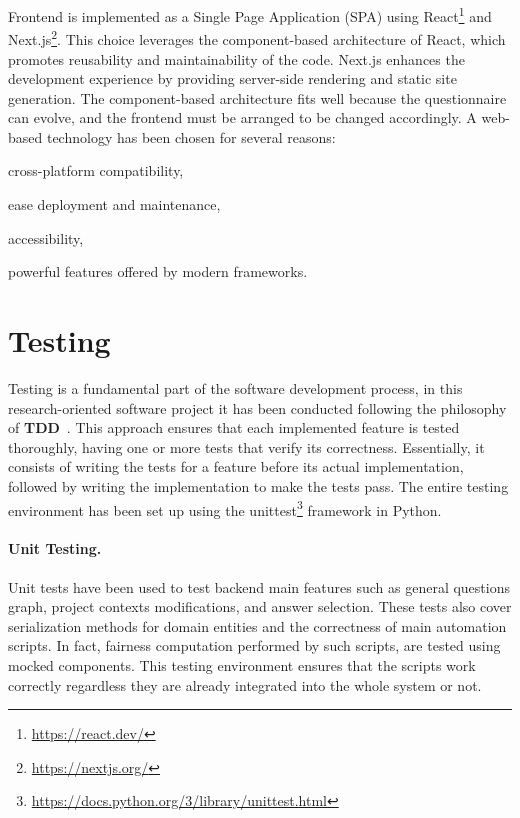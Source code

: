 \documentclass[12pt,a4paper,openright,twoside]{book}
\begin{document}
Frontend is implemented as a Single Page Application (SPA) using React\footnote{\url{https://react.dev/}} and Next.js\footnote{\url{https://nextjs.org/}}.
%
This choice leverages the component-based architecture of React, which promotes reusability and maintainability of the code.
%
Next.js enhances the development experience by providing server-side rendering and static site generation.
%
The component-based architecture fits well because the questionnaire can evolve, and the frontend must be arranged to be changed accordingly.
%
A web-based technology has been chosen for several reasons:
\begin{enumerate*}[label=(\roman*)]
    \item cross-platform compatibility,
    \item ease deployment and maintenance,
    \item accessibility,
    \item powerful features offered by modern frameworks.
\end{enumerate*}

\section{Testing}

Testing is a fundamental part of the software development process, in this research-oriented software project it has been conducted following the philosophy of \textbf{\ac{TDD}}~\cite{beck2022test}.
%
This approach ensures that each implemented feature is tested thoroughly,
having one or more tests that verify its correctness.
%
Essentially, it consists of writing the tests for a feature before its actual implementation, followed by writing the implementation to make the tests pass.
%
The entire testing environment has been set up using the unittest\footnote{\url{https://docs.python.org/3/library/unittest.html}} framework in Python.

\paragraph{Unit Testing.}

Unit tests have been used to test backend main features such as general questions graph, project contexts modifications, and answer selection.
%
These tests also cover serialization methods for domain entities and the correctness of main automation scripts.
%
In fact, fairness computation performed by such scripts, are tested using mocked components.
%
This testing environment ensures that the scripts work correctly regardless they are already integrated into the whole system or not.
\end{document}
